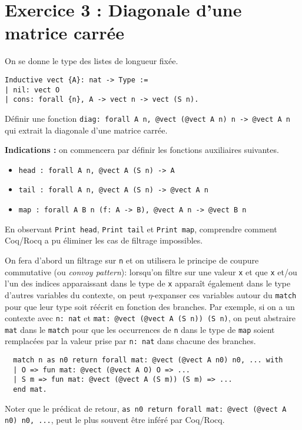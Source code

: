 \documentclass{article}
\begin{document}
\section*{Exercice 3 : Diagonale d'une matrice carrée}

On se donne le type des listes de longueur fixée.
\begin{verbatim}
Inductive vect {A}: nat -> Type := 
| nil: vect O
| cons: forall {n}, A -> vect n -> vect (S n).
\end{verbatim}

Définir une fonction \texttt{diag: forall A n, @vect (@vect A n) n -> @vect A n} qui extrait la diagonale d'une matrice carrée.

\textbf{Indications :} on commencera par définir les fonctions auxiliaires suivantes.

\begin{itemize}
\item \texttt{head : forall {A} {n}, @vect A (S n) -> A}
\item \texttt{tail : forall {A} {n}, @vect A (S n) -> @vect A n}
\item \texttt{map : forall {A} {B} {n} (f: A -> B), @vect A n -> @vect B n}
\end{itemize}

En observant \texttt{Print head}, \texttt{Print tail} et \texttt{Print map}, comprendre comment Coq/Rocq a pu éliminer les cas de filtrage impossibles.

On fera d'abord un filtrage sur \texttt{n} et on utilisera le principe de coupure commutative (ou \emph{convoy pattern}):
lorsqu'on filtre sur une valeur \texttt{x} et que \texttt{x} et/ou l'un des indices apparaissant dans le type de \texttt{x}
apparaît également dans le type d'autres variables du contexte, on peut \(\eta\)-expanser ces variables autour du \texttt{match} pour que leur type soit réécrit en fonction des branches.
Par exemple, si on a un contexte avec \texttt{n: nat} et \texttt{mat: @vect (@vect A (S n)) (S n)}, on peut abstraire
\texttt{mat} dans le \texttt{match} pour que les occurrences de \texttt{n} dans le type de \texttt{map} soient remplacées par la valeur prise par \texttt{n: nat} dans chacune des branches.
\begin{verbatim}
  match n as n0 return forall mat: @vect (@vect A n0) n0, ... with
  | O => fun mat: @vect (@vect A O) O => ...
  | S m => fun mat: @vect (@vect A (S m)) (S m) => ...
  end mat.
\end{verbatim}
Noter que le prédicat de retour, \texttt{as n0 return forall mat: @vect (@vect A n0) n0, ...}, peut le plus souvent être inféré par Coq/Rocq.
\end{document}

